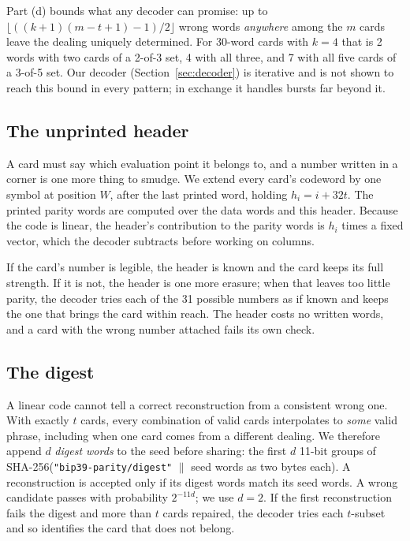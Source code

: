 \documentclass[numeric]{anvil-paper}
\newcommand{\code}[1]{\texttt{#1}}
\begin{document}
Part (d) bounds what any decoder can promise: up to
$\lfloor((k+1)(m-t+1)-1)/2\rfloor$ wrong words \emph{anywhere} among the $m$
cards leave the dealing uniquely determined. For 30-word cards with $k=4$ that
is 2 words with two cards of a 2-of-3 set, 4 with all three, and 7 with all
five cards of a 3-of-5 set. Our decoder (Section~\ref{sec:decoder}) is iterative
and is not shown to reach this bound in every pattern; in exchange it handles
bursts far beyond it.

\subsection{The unprinted header}

A card must say which evaluation point it belongs to, and a number written in a
corner is one more thing to smudge. We extend every card's codeword by one
symbol at position $W$, after the last printed word, holding
$h_i = i + 32t$. The printed parity words are computed over the data words and
this header. Because the code is linear, the header's contribution to the
parity words is $h_i$ times a fixed vector, which the decoder subtracts before
working on columns.

If the card's number is legible, the header is known and the card keeps its
full strength. If it is not, the header is one more erasure; when that leaves
too little parity, the decoder tries each of the 31 possible numbers as if
known and keeps the one that brings the card within reach. The header costs no
written words, and a card with the wrong number attached fails its own check.

\subsection{The digest}
\label{sec:digest}

A linear code cannot tell a correct reconstruction from a consistent wrong one.
With exactly $t$ cards, every combination of valid cards interpolates to
\emph{some} valid phrase, including when one card comes from a different
dealing. We therefore append $d$ \emph{digest words} to the seed before
sharing: the first $d$ 11-bit groups of
SHA-256(\code{"bip39-parity/digest"} $\|$ seed words as two bytes each).
A reconstruction is accepted only if its digest words match its seed words. A
wrong candidate passes with probability $2^{-11d}$; we use $d=2$. If the first
reconstruction fails the digest and more than $t$ cards repaired, the decoder
tries each $t$-subset and so identifies the card that does not belong.
\end{document}
